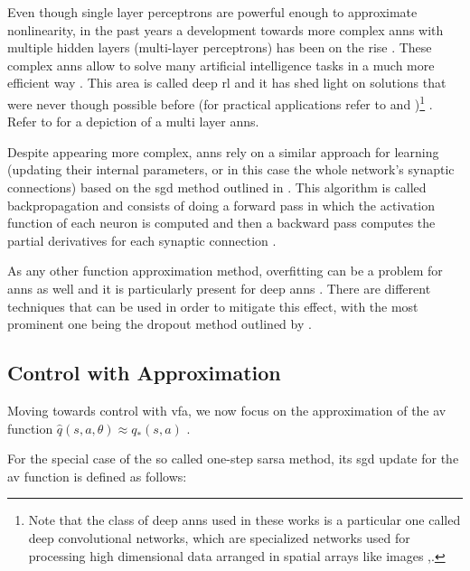 Even though single layer perceptrons are powerful enough to approximate nonlinearity, in the past years a development towards more complex \glspl{ann} with multiple hidden layers (\ie multi-layer perceptrons) has been on the rise \citep[p. 217]{Sutton2017}. These complex \glspl{ann} allow to solve many artificial intelligence tasks in a much more efficient way \citep{Bengio2009}. This area is called deep \gls{rl} and it has shed light on solutions that were never though possible before (for practical applications refer to \citet{Mnih2015} and \citet{Silver2016})\footnote{Note that the class of deep \glspl{ann} used in these works is a particular one called deep convolutional networks, which are specialized networks used for processing high dimensional data arranged in spatial arrays like images \citep[p. 219]{Sutton2017},\citep{Lecun1998}.} \citep{Bengio2009}. Refer to  for a depiction of a multi layer \glspl{ann}.


Despite appearing more complex, \glspl{ann} rely on a similar approach for learning (\ie updating their internal parameters, or in this case the whole network's synaptic connections) based on the \gls{sgd} method outlined in  \citep[p. 217]{Sutton2017}. This algorithm is called backpropagation and consists of doing a forward pass in which the activation function of each neuron is computed and then a backward pass computes the partial derivatives for each synaptic connection \citep[p. 218]{Sutton2017}.

As any other function approximation method, overfitting can be a problem for \glspl{ann} as well and it is particularly present for deep \glspl{ann} \citep[p. 218]{Sutton2017}. There are different techniques that can be used in order to mitigate this effect, with the most prominent one being the dropout method outlined by \citet{Srivastava2014}.

\subsection{ Control with Approximation}
\label{subsec:onpol_control}

Moving towards control with \gls{vfa}, we now focus on the approximation of the \gls{av} function $\hat{q} (s,a,\theta) \approx q_* (s,a)$ \citep[p. 229]{Sutton2017}.

For the special case of the so called one-step \gls{sarsa} method, its \gls{sgd} update for the \gls{av} function is defined as follows:

